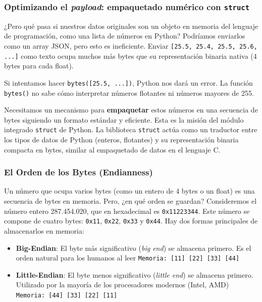 \subsubsection{Optimizando el \textit{payload}: empaquetado numérico con \texttt{struct}}

¿Pero qué pasa si nuestros datos originales son un objeto en memoria del lenguaje de programación, como una lista de números en Python? Podríamos enviarlos como un array JSON, pero esto es ineficiente. Enviar \lstinline|[25.5, 25.4, 25.5, 25.6, ...]| como texto ocupa muchos más bytes que su representación binaria nativa (4 bytes para cada float).

Si intentamos hacer \texttt{bytes([25.5, ...])}, Python nos dará un error. La función \texttt{bytes()} no sabe cómo interpretar números flotantes ni números mayores de 255.

Necesitamos un mecanismo para \textbf{empaquetar} estos números en una secuencia de bytes siguiendo un formato estándar y eficiente. Esta es la misión del módulo integrado \texttt{struct} de Python. La biblioteca \texttt{struct} actúa como un traductor entre los tipos de datos de Python (enteros, flotantes) y su representación binaria compacta en bytes, similar al empaquetado de datos en el lenguaje C.

\subsubsection*{El Orden de los Bytes (Endianness)}
Un número que ocupa varios bytes (como un entero de 4 bytes o un float) es una secuencia de bytes en memoria. Pero, ¿en qué orden se guardan? Consideremos el número entero 287.454.020, que en hexadecimal es \texttt{0x11223344}. Este número se compone de cuatro bytes: \texttt{0x11}, \texttt{0x22}, \texttt{0x33} y \texttt{0x44}. Hay dos formas principales de almacenarlos en memoria:

\begin{itemize}
    \item \textbf{Big-Endian}: El byte más significativo (\textit{big end}) se almacena primero. Es el orden natural para los humanos al leer \arrowkeyright \space \texttt{Memoria: [11] [22] [33] [44]}

    \item \textbf{Little-Endian}: El byte menos significativo (\textit{little end}) se almacena primero. Utilizado por la mayoría de los procesadores modernos (Intel, AMD) \arrowkeyright \space  \texttt{Memoria: [44] [33] [22] [11]}
\end{itemize}

